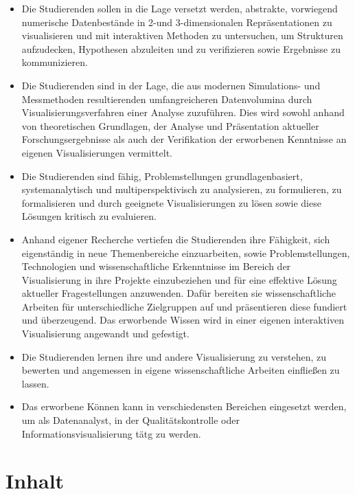 \begin{itemize}
\tightlist
\item
  Die Studierenden sollen in die Lage versetzt werden, abstrakte,
  vorwiegend numerische Datenbestände in 2-und 3-dimensionalen
  Repräsentationen zu visualisieren und mit interaktiven Methoden zu
  untersuchen, um Strukturen aufzudecken, Hypothesen abzuleiten und zu
  verifizieren sowie Ergebnisse zu kommunizieren.
\item
  Die Studierenden sind in der Lage, die aus modernen Simulations- und
  Messmethoden resultierenden umfangreicheren Datenvolumina durch
  Visualisierungsverfahren einer Analyse zuzuführen. Dies wird sowohl
  anhand von theoretischen Grundlagen, der Analyse und Präsentation
  aktueller Forschungsergebnisse als auch der Verifikation der
  erworbenen Kenntnisse an eigenen Visualisierungen vermittelt.
\item
  Die Studierenden sind fähig, Problemstellungen grundlagenbasiert,
  systemanalytisch und multiperspektivisch zu analysieren, zu
  formulieren, zu formalisieren und durch geeignete Visualisierungen zu
  lösen sowie diese Lösungen kritisch zu evaluieren.
\item
  Anhand eigener Recherche vertiefen die Studierenden ihre Fähigkeit,
  sich eigenständig in neue Themenbereiche einzuarbeiten, sowie
  Problemstellungen, Technologien und wissenschaftliche Erkenntnisse im
  Bereich der Visualisierung in ihre Projekte einzubeziehen und für eine
  effektive Lösung aktueller Fragestellungen anzuwenden. Dafür bereiten
  sie wissenschaftliche Arbeiten für unterschiedliche Zielgruppen auf
  und präsentieren diese fundiert und überzeugend. Das erworbende Wissen
  wird in einer eigenen interaktiven Visualisierung angewandt und
  gefestigt.
\item
  Die Studierenden lernen ihre und andere Visualisierung zu verstehen,
  zu bewerten und angemessen in eigene wissenschaftliche Arbeiten
  einfließen zu lassen.
\item
  Das erworbene Können kann in verschiedensten Bereichen eingesetzt
  werden, um als Datenanalyst, in der Qualitätskontrolle oder
  Informationsvisualisierung tätg zu werden.
\end{itemize}

\section*{Inhalt\label{/mi-2017/modulbeschreibungen-master/MA_VC_Modul_Visualisierung}}\label{inhaltpathlabelmi-2017modulbeschreibungen-mastermaux5fvcux5fmodulux5fvisualisierung}

